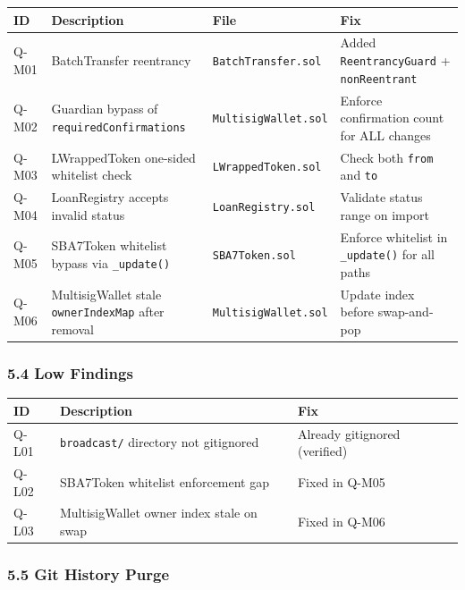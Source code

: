 \documentclass[
]{article}
\newcounter{none} %
\begin{document}
{\def\LTcaptype{none} %
\begin{longtable}[]{@{}llll@{}}
\toprule\noalign{}
ID & Description & File & Fix \\
\midrule\noalign{}
\endhead
\bottomrule\noalign{}
\endlastfoot
Q-M01 & BatchTransfer reentrancy & \texttt{BatchTransfer.sol} & Added
\texttt{ReentrancyGuard} + \texttt{nonReentrant} \\
Q-M02 & Guardian bypass of \texttt{requiredConfirmations} &
\texttt{MultisigWallet.sol} & Enforce confirmation count for ALL
changes \\
Q-M03 & LWrappedToken one-sided whitelist check &
\texttt{LWrappedToken.sol} & Check both \texttt{from} and \texttt{to} \\
Q-M04 & LoanRegistry accepts invalid status & \texttt{LoanRegistry.sol}
& Validate status range on import \\
Q-M05 & SBA7Token whitelist bypass via \texttt{\_update()} &
\texttt{SBA7Token.sol} & Enforce whitelist in \texttt{\_update()} for
all paths \\
Q-M06 & MultisigWallet stale \texttt{ownerIndexMap} after removal &
\texttt{MultisigWallet.sol} & Update index before swap-and-pop \\
\end{longtable}
}

\subsubsection{5.4 Low Findings}\label{54-low-findings}

{\def\LTcaptype{none} %
\begin{longtable}[]{@{}lll@{}}
\toprule\noalign{}
ID & Description & Fix \\
\midrule\noalign{}
\endhead
\bottomrule\noalign{}
\endlastfoot
Q-L01 & \texttt{broadcast/} directory not gitignored & Already
gitignored (verified) \\
Q-L02 & SBA7Token whitelist enforcement gap & Fixed in Q-M05 \\
Q-L03 & MultisigWallet owner index stale on swap & Fixed in Q-M06 \\
\end{longtable}
}

\subsubsection{5.5 Git History Purge}\label{55-git-history-purge}
\end{document}
